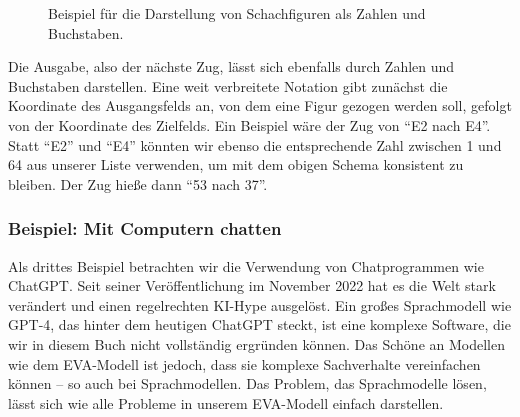 \documentclass[
  ngerman,
  letterpaper,
  DIV=11]{scrreprt}
\begin{document}
\begin{figure}


\caption{\label{fig-coding-chess-figures}Beispiel für die Darstellung
von Schachfiguren als Zahlen und Buchstaben.}

\end{figure}%

Die Ausgabe, also der nächste Zug, lässt sich ebenfalls durch Zahlen und
Buchstaben darstellen. Eine weit verbreitete Notation gibt zunächst die
Koordinate des Ausgangsfelds an, von dem eine Figur gezogen werden soll,
gefolgt von der Koordinate des Zielfelds. Ein Beispiel wäre der Zug von
``E2 nach E4''. Statt ``E2'' und ``E4'' könnten wir ebenso die
entsprechende Zahl zwischen 1 und 64 aus unserer Liste verwenden, um mit
dem obigen Schema konsistent zu bleiben. Der Zug hieße dann ``53 nach
37''.

\subsubsection{Beispiel: Mit Computern
chatten}\label{beispiel-mit-computern-chatten}

Als drittes Beispiel betrachten wir die Verwendung von Chatprogrammen
wie ChatGPT. Seit seiner Veröffentlichung im November 2022 hat es die
Welt stark verändert und einen regelrechten KI-Hype ausgelöst. Ein
großes Sprachmodell wie GPT-4, das hinter dem heutigen ChatGPT steckt,
ist eine komplexe Software, die wir in diesem Buch nicht vollständig
ergründen können. Das Schöne an Modellen wie dem EVA-Modell ist jedoch,
dass sie komplexe Sachverhalte vereinfachen können -- so auch bei
Sprachmodellen. Das Problem, das Sprachmodelle lösen, lässt sich wie
alle Probleme in unserem EVA-Modell einfach darstellen.
\end{document}

